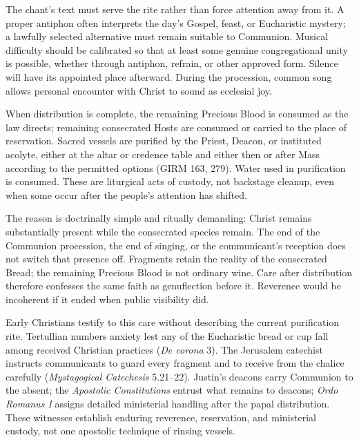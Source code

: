 The chant's text must serve the rite rather than force attention away from it. A proper antiphon often interprets the day's Gospel, feast, or Eucharistic mystery; a lawfully selected alternative must remain suitable to Communion. Musical difficulty should be calibrated so that at least some genuine congregational unity is possible, whether through antiphon, refrain, or other approved form. Silence will have its appointed place afterward. During the procession, common song allows personal encounter with Christ to sound as ecclesial joy.


When distribution is complete, the remaining Precious Blood is consumed as the law directs; remaining consecrated Hosts are consumed or carried to the place of reservation. Sacred vessels are purified by the Priest, Deacon, or instituted acolyte, either at the altar or credence table and either then or after Mass according to the permitted options (GIRM 163, 279). Water used in purification is consumed. These are liturgical acts of custody, not backstage cleanup, even when some occur after the people's attention has shifted.

The reason is doctrinally simple and ritually demanding: Christ remains substantially present while the consecrated species remain. The end of the Communion procession, the end of singing, or the communicant's reception does not switch that presence off. Fragments retain the reality of the consecrated Bread; the remaining Precious Blood is not ordinary wine. Care after distribution therefore confesses the same faith as genuflection before it. Reverence would be incoherent if it ended when public visibility did.

Early Christians testify to this care without describing the current purification rite. Tertullian numbers anxiety lest any of the Eucharistic bread or cup fall among received Christian practices (\emph{De corona} 3). The Jerusalem catechist instructs communicants to guard every fragment and to receive from the chalice carefully (\emph{Mystagogical Catechesis} 5.21--22). Justin's deacons carry Communion to the absent; the \emph{Apostolic Constitutions} entrust what remains to deacons; \emph{Ordo Romanus I} assigns detailed ministerial handling after the papal distribution. These witnesses establish enduring reverence, reservation, and ministerial custody, not one apostolic technique of rinsing vessels.

